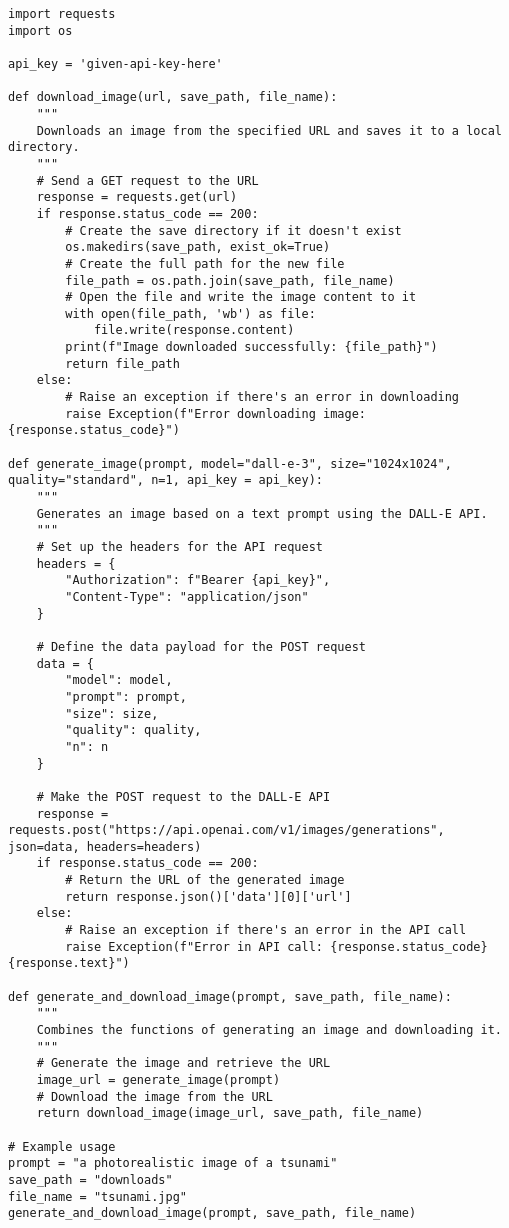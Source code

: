 \begin{lstlisting}
import requests
import os

api_key = 'given-api-key-here'

def download_image(url, save_path, file_name):
    """
    Downloads an image from the specified URL and saves it to a local directory.
    """
    # Send a GET request to the URL
    response = requests.get(url)
    if response.status_code == 200:
        # Create the save directory if it doesn't exist
        os.makedirs(save_path, exist_ok=True)
        # Create the full path for the new file
        file_path = os.path.join(save_path, file_name)
        # Open the file and write the image content to it
        with open(file_path, 'wb') as file:
            file.write(response.content)
        print(f"Image downloaded successfully: {file_path}")
        return file_path
    else:
        # Raise an exception if there's an error in downloading
        raise Exception(f"Error downloading image: {response.status_code}")

def generate_image(prompt, model="dall-e-3", size="1024x1024", quality="standard", n=1, api_key = api_key):
    """
    Generates an image based on a text prompt using the DALL-E API.
    """
    # Set up the headers for the API request
    headers = {
        "Authorization": f"Bearer {api_key}",
        "Content-Type": "application/json"
    }

    # Define the data payload for the POST request
    data = {
        "model": model,
        "prompt": prompt,
        "size": size,
        "quality": quality,
        "n": n
    }

    # Make the POST request to the DALL-E API
    response = requests.post("https://api.openai.com/v1/images/generations", json=data, headers=headers)
    if response.status_code == 200:
        # Return the URL of the generated image
        return response.json()['data'][0]['url']
    else:
        # Raise an exception if there's an error in the API call
        raise Exception(f"Error in API call: {response.status_code} {response.text}")

def generate_and_download_image(prompt, save_path, file_name):
    """
    Combines the functions of generating an image and downloading it.
    """
    # Generate the image and retrieve the URL
    image_url = generate_image(prompt)
    # Download the image from the URL
    return download_image(image_url, save_path, file_name)

# Example usage
prompt = "a photorealistic image of a tsunami"
save_path = "downloads"
file_name = "tsunami.jpg"
generate_and_download_image(prompt, save_path, file_name)


\end{lstlisting}

